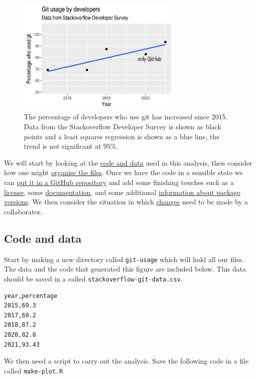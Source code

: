 \documentclass[11pt,onecolumn]{scrartcl}
\begin{document}
\begin{figure}[htbp]
\centering
\includegraphics[width=8cm]{./git-usage-1.png}
\caption{\label{fig:demo-result-1}The percentage of developers who use git has increased since 2015. Data from the Stackoverflow Developer Survey is shown as black points and a least squares regression is shown as a blue line, the trend is not significant at \(95\%\).}
\end{figure}

We will start by looking at the \hyperref[sec:orgbabc6bb]{code and data} used in this analysis, then
consider how one might \hyperref[sec:org6f95efd]{organise the files}. Once we have the code in a sensible
state we can \hyperref[sec:org081bd1a]{put it in a GitHub repository} and add some finishing touches such
as a \hyperref[sec:org0bd7a63]{license}, some \hyperref[sec:org1256f52]{documentation}, and some additional \hyperref[sec:orgab3fce7]{information about package
versions}. We then consider the situation in which \hyperref[sec:org0f8e725]{changes} need to be made by a
collaborator.

\subsection{Code and data}
\label{sec:orgbabc6bb}

Start by making a new directory called \texttt{git-usage} which will hold all our
files. The data and the code that generated this figure are included below. This
data should be saved in a called \texttt{stackoverflow-git-data.csv}.

\begin{verbatim}
year,percentage
2015,69.3
2017,69.2
2018,87.2
2020,82.8
2021,93.43
\end{verbatim}

We then need a script to carry out the analysis. Save the following code in a
file called \texttt{make-plot.R}
\end{document}
